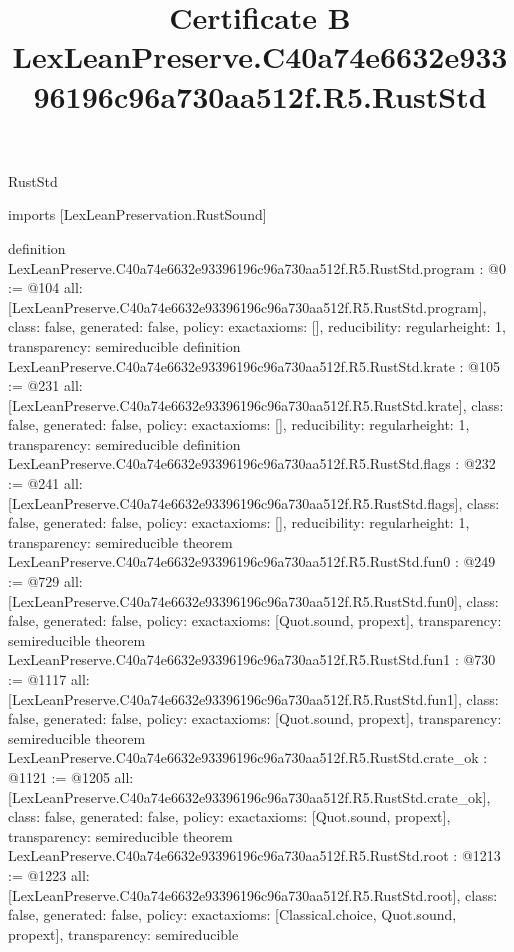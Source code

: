\begin{lexlean}{RustStd}
\title{Certificate B LexLeanPreserve.C40a74e6632e93396196c96a730aa512f.R5.RustStd}
\begin{coremodule}
imports [LexLeanPreservation.RustSound]

definition LexLeanPreserve.C40a74e6632e93396196c96a730aa512f.R5.RustStd.program : @0 := @104 {
  all: [LexLeanPreserve.C40a74e6632e93396196c96a730aa512f.R5.RustStd.program],
  class: false,
  generated: false,
  policy: exact{axioms: []},
  reducibility: regular{height: 1},
  transparency: semireducible
}
definition LexLeanPreserve.C40a74e6632e93396196c96a730aa512f.R5.RustStd.krate : @105 := @231 {
  all: [LexLeanPreserve.C40a74e6632e93396196c96a730aa512f.R5.RustStd.krate],
  class: false,
  generated: false,
  policy: exact{axioms: []},
  reducibility: regular{height: 1},
  transparency: semireducible
}
definition LexLeanPreserve.C40a74e6632e93396196c96a730aa512f.R5.RustStd.flags : @232 := @241 {
  all: [LexLeanPreserve.C40a74e6632e93396196c96a730aa512f.R5.RustStd.flags],
  class: false,
  generated: false,
  policy: exact{axioms: []},
  reducibility: regular{height: 1},
  transparency: semireducible
}
theorem LexLeanPreserve.C40a74e6632e93396196c96a730aa512f.R5.RustStd.fun0 : @249 := @729 {
  all: [LexLeanPreserve.C40a74e6632e93396196c96a730aa512f.R5.RustStd.fun0],
  class: false,
  generated: false,
  policy: exact{axioms: [Quot.sound, propext]},
  transparency: semireducible
}
theorem LexLeanPreserve.C40a74e6632e93396196c96a730aa512f.R5.RustStd.fun1 : @730 := @1117 {
  all: [LexLeanPreserve.C40a74e6632e93396196c96a730aa512f.R5.RustStd.fun1],
  class: false,
  generated: false,
  policy: exact{axioms: [Quot.sound, propext]},
  transparency: semireducible
}
theorem LexLeanPreserve.C40a74e6632e93396196c96a730aa512f.R5.RustStd.crate_ok : @1121 := @1205 {
  all: [LexLeanPreserve.C40a74e6632e93396196c96a730aa512f.R5.RustStd.crate_ok],
  class: false,
  generated: false,
  policy: exact{axioms: [Quot.sound, propext]},
  transparency: semireducible
}
theorem LexLeanPreserve.C40a74e6632e93396196c96a730aa512f.R5.RustStd.root : @1213 := @1223 {
  all: [LexLeanPreserve.C40a74e6632e93396196c96a730aa512f.R5.RustStd.root],
  class: false,
  generated: false,
  policy: exact{axioms: [Classical.choice, Quot.sound, propext]},
  transparency: semireducible
}


\end{coremodule}
\end{lexlean}
